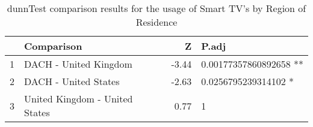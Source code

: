 \begin{table}[ht]
\centering
\begin{tabular}{rlrl}
  \hline
 & Comparison & Z & P.adj \\ 
  \hline
1 & DACH - United Kingdom & -3.44 & 0.00177357860892658 ** \\ 
  2 & DACH - United States & -2.63 & 0.0256795239314102 * \\ 
  3 & United Kingdom - United States & 0.77 & 1   \\ 
   \hline
\end{tabular}
\caption{dunnTest comparison results for the usage of Smart TV's by Region of Residence} 
\label{RQ2_H2_UsageRegionSmartTV}
\end{table}
